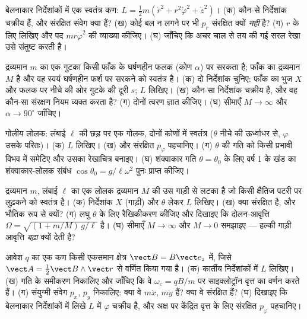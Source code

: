 \begin{exercise}[$\star$]\label{exo:b3:lagrangian-mechanics:4}
बेलनाकार निर्देशांकों में एक स्वतंत्र कण: $L = \tfrac12 m(\dot r^2 +
r^2\dot\varphi^2 + \dot z^2)$। (क) कौन-से निर्देशांक चक्रीय हैं, और
संरक्षित संवेग क्या हैं? (ख) कोई बल न लगने पर भी $p_r$ संरक्षित क्यों
\emph{नहीं} है? (ग) $r$ के लिए  लिखिए और पद
$mr\dot\varphi^2$ की व्याख्या कीजिए। (घ) जाँचिए कि अचर चाल से तय की गई
सरल रेखा उसे संतुष्ट करती है।
\end{exercise}

\begin{exercise}[$\star\star$]\label{exo:b3:lagrangian-mechanics:5}
द्रव्यमान $m$ का एक गुटका किसी फाँक के घर्षणहीन फलक (कोण $\alpha$) पर
सरकता है; फाँक का द्रव्यमान $M$ है और वह स्वयं घर्षणहीन फर्श पर सरकने
को स्वतंत्र है। (क) दो निर्देशांक चुनिए: फाँक का भुज $X$ और फलक पर नीचे
की ओर गुटके की दूरी $s$; $L$ लिखिए। (ख) कौन-सा निर्देशांक चक्रीय है,
और वह कौन-सा संरक्षण नियम व्यक्त करता है? (ग) दोनों त्वरण ज्ञात कीजिए।
(घ) सीमाएँ $M \to \infty$ और $\alpha \to
90^\circ$ जाँचिए।
\end{exercise}

\begin{exercise}[$\star\star$]\label{exo:b3:lagrangian-mechanics:6}
गोलीय लोलक: लंबाई $\ell$ की छड़ पर एक गोलक, दोनों कोणों में स्वतंत्र
($\theta$ नीचे की ऊर्ध्वाधर से, $\varphi$ उसके परितः)। (क)
$L$ लिखिए। (ख)  और संरक्षित
$p_\varphi$ पहचानिए। (ग) $\theta$ की गति को किसी प्रभावी विभव में
समेटिए और उसका रेखाचित्र बनाइए। (घ) शंक्वाकार गति $\theta =
\theta_0$ के लिए वर्ष 1 के खंड का शंक्वाकार-लोलक संबंध $\cos\theta_0 =
g/\ell\omega^2$ पुनः प्राप्त कीजिए।
\end{exercise}

\begin{exercise}[$\star\star$]\label{exo:b3:lagrangian-mechanics:7}
द्रव्यमान $m$, लंबाई $\ell$ का एक लोलक द्रव्यमान $M$ की उस गाड़ी से
लटका है जो किसी क्षैतिज पटरी पर लुढ़कने को स्वतंत्र है। (क) निर्देशांक
$X$ (गाड़ी) और $\theta$ लेकर $L$ लिखिए। (ख) क्या संरक्षित है, और
भौतिक रूप से क्यों? (ग) लघु $\theta$ के लिए रैखिकीकरण कीजिए और दिखाइए
कि दोलन-आवृत्ति $\Omega = \sqrt{(1 + m/M)\,g/\ell}$ है। (घ) सीमाएँ $M \to
\infty$ और $M \to 0$ समझाइए --- हल्की गाड़ी आवृत्ति \emph{बढ़ा} क्यों
देती है?
\end{exercise}

\begin{exercise}[$\star\star$]\label{exo:b3:lagrangian-mechanics:8}
आवेश $q$ का एक कण किसी एकसमान क्षेत्र $\vect B = B\vect e_z$ में,
जिसे $\vect A = \tfrac12\vect B\wedge\vect r$ से वर्णित किया गया है।
(क) कार्तीय निर्देशांकों में $L$ लिखिए। (ख) गति के समीकरण निकालिए और
जाँचिए कि वे $\omega_{\text{c}} = qB/m$ पर साइक्लोट्रॉन वृत्त का वर्णन
करते हैं। (ग) संयुग्मी संवेग $p_x$, $p_y$ निकालिए: क्या वे $m\dot x$,
$m\dot y$ हैं? क्या वे संरक्षित हैं? (घ) दिखाइए कि बेलनाकार
निर्देशांकों में लिखे $L$ में $\varphi$ चक्रीय है, और अक्ष पर केंद्रित
वृत्त के लिए संरक्षित $p_\varphi$ पहचानिए।
\end{exercise}

